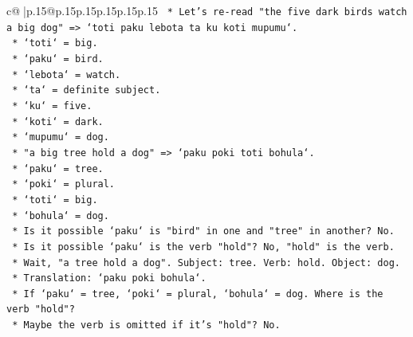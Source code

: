 \documentclass{article}
\begin{document}
{\begin{supertabular}{c@{$\;$}|p{.15\linewidth}@{}p{.15\linewidth}p{.15\linewidth}p{.15\linewidth}p{.15\linewidth}p{.15\linewidth}}
{{{\texttt{                                            *   Let's re{-}read "the five dark birds watch a big dog" => `toti paku lebota ta ku koti mupumu`.} \\
\texttt{                                                *   `toti` = big.} \\
\texttt{                                                *   `paku` = bird.} \\
\texttt{                                                *   `lebota` = watch.} \\
\texttt{                                                *   `ta` = definite subject.} \\
\texttt{                                                *   `ku` = five.} \\
\texttt{                                                *   `koti` = dark.} \\
\texttt{                                                *   `mupumu` = dog.} \\
\texttt{                                            *   "a big tree hold a dog" => `paku poki toti bohula`.} \\
\texttt{                                                *   `paku` = tree.} \\
\texttt{                                                *   `poki` = plural.} \\
\texttt{                                                *   `toti` = big.} \\
\texttt{                                                *   `bohula` = dog.} \\
\texttt{                                            *   Is it possible `paku` is "bird" in one and "tree" in another? No.} \\
\texttt{                                            *   Is it possible `paku` is the verb "hold"? No, "hold" is the verb.} \\
\texttt{                                            *   Wait, "a tree hold a dog". Subject: tree. Verb: hold. Object: dog.} \\
\texttt{                                            *   Translation: `paku poki bohula`.} \\
\texttt{                                            *   If `paku` = tree, `poki` = plural, `bohula` = dog. Where is the verb "hold"?} \\
\texttt{                                            *   Maybe the verb is omitted if it's "hold"? No.} \\
}}}
\end{supertabular}}
\end{document}
